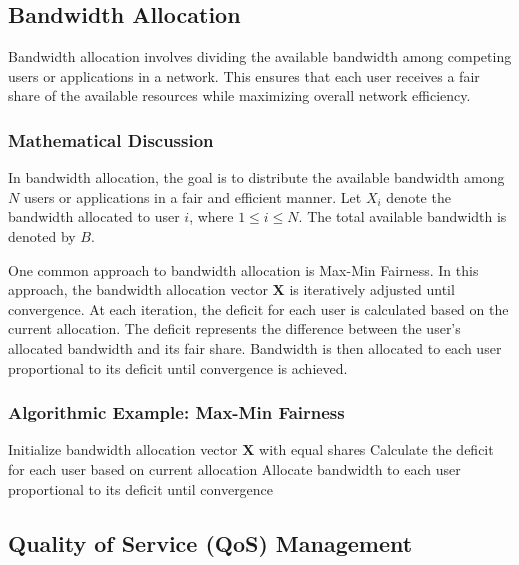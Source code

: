 \documentclass[12pt]{book} %
\begin{document}
\subsection{Bandwidth Allocation}

Bandwidth allocation involves dividing the available bandwidth among competing users or applications in a network. This ensures that each user receives a fair share of the available resources while maximizing overall network efficiency.

\subsubsection{Mathematical Discussion}

In bandwidth allocation, the goal is to distribute the available bandwidth among $N$ users or applications in a fair and efficient manner. Let $X_i$ denote the bandwidth allocated to user $i$, where $1 \leq i \leq N$. The total available bandwidth is denoted by $B$.

One common approach to bandwidth allocation is Max-Min Fairness. In this approach, the bandwidth allocation vector $\mathbf{X}$ is iteratively adjusted until convergence. At each iteration, the deficit for each user is calculated based on the current allocation. The deficit represents the difference between the user's allocated bandwidth and its fair share. Bandwidth is then allocated to each user proportional to its deficit until convergence is achieved.

\subsubsection{Algorithmic Example: Max-Min Fairness}
\FloatBarrier
\begin{algorithm}[H]
\caption{Max-Min Fairness}
\begin{algorithmic}[1]
\State Initialize bandwidth allocation vector $\mathbf{X}$ with equal shares
    \State Calculate the deficit for each user based on current allocation
    \State Allocate bandwidth to each user proportional to its deficit until convergence
\EndWhile
\end{algorithmic}
\end{algorithm}
\FloatBarrier

\subsection{Quality of Service (QoS) Management}
\end{document}
